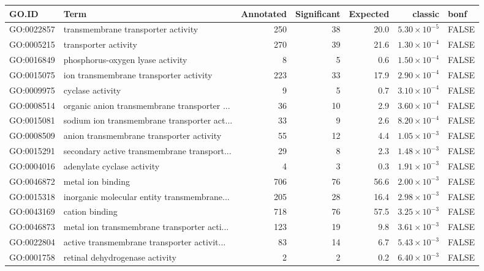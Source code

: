 \begin{table}[ht]
\centering
\begin{adjustbox}{max width=\textwidth}
\begin{tabular}{llrrrrl}
  \hline
GO.ID & Term & Annotated & Significant & Expected & classic & bonf \\ 
  \hline
GO:0022857 & transmembrane transporter activity & 250 & 38 & 20.0 & $5.30 \times 10^{-5}$ & FALSE \\ 
  GO:0005215 & transporter activity & 270 & 39 & 21.6 & $1.30 \times 10^{-4}$ & FALSE \\ 
  GO:0016849 & phosphorus-oxygen lyase activity & 8 & 5 & 0.6 & $1.50 \times 10^{-4}$ & FALSE \\ 
  GO:0015075 & ion transmembrane transporter activity & 223 & 33 & 17.9 & $2.90 \times 10^{-4}$ & FALSE \\ 
  GO:0009975 & cyclase activity & 9 & 5 & 0.7 & $3.10 \times 10^{-4}$ & FALSE \\ 
  GO:0008514 & organic anion transmembrane transporter ... & 36 & 10 & 2.9 & $3.60 \times 10^{-4}$ & FALSE \\ 
  GO:0015081 & sodium ion transmembrane transporter act... & 33 & 9 & 2.6 & $8.20 \times 10^{-4}$ & FALSE \\ 
  GO:0008509 & anion transmembrane transporter activity & 55 & 12 & 4.4 & $1.05 \times 10^{-3}$ & FALSE \\ 
  GO:0015291 & secondary active transmembrane transport... & 29 & 8 & 2.3 & $1.48 \times 10^{-3}$ & FALSE \\ 
  GO:0004016 & adenylate cyclase activity & 4 & 3 & 0.3 & $1.91 \times 10^{-3}$ & FALSE \\ 
  GO:0046872 & metal ion binding & 706 & 76 & 56.6 & $2.00 \times 10^{-3}$ & FALSE \\ 
  GO:0015318 & inorganic molecular entity transmembrane... & 205 & 28 & 16.4 & $2.98 \times 10^{-3}$ & FALSE \\ 
  GO:0043169 & cation binding & 718 & 76 & 57.5 & $3.25 \times 10^{-3}$ & FALSE \\ 
  GO:0046873 & metal ion transmembrane transporter acti... & 123 & 19 & 9.8 & $3.61 \times 10^{-3}$ & FALSE \\ 
  GO:0022804 & active transmembrane transporter activit... & 83 & 14 & 6.7 & $5.43 \times 10^{-3}$ & FALSE \\ 
  GO:0001758 & retinal dehydrogenase activity & 2 & 2 & 0.2 & $6.40 \times 10^{-3}$ & FALSE \\ 

\end{tabular}
\end{adjustbox}
\end{table}
